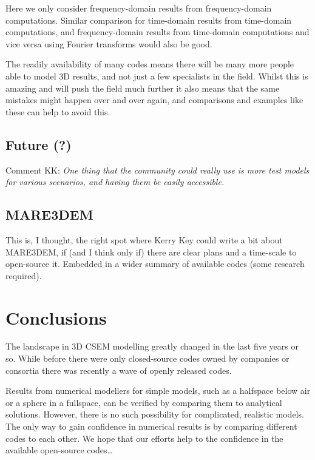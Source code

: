 \documentclass[
    paper,
  ]{geophysics}
\begin{document}
Here we only consider frequency-domain results from frequency-domain
computations. Similar comparison for time-domain results from time-domain
computations, and frequency-domain results from time-domain computations and
vice versa using Fourier transforms would also be good.

The readily availability of many codes means there will be many more people
able to model 3D results, and not just a few specialists in the field. Whilst
this is amazing and will push the field much further it also means that the
same mistakes might happen over and over again, and comparisons and examples
like these can help to avoid this.

\subsection{Future (?)}

Comment KK: \emph{One thing that the community could really use is more test
models for various scenarios, and having them be easily accessible.}


\subsection{MARE3DEM}

This is, I thought, the right spot where Kerry Key could write a bit about
MARE3DEM, if (and I think only if) there are clear plans and a time-scale to
open-source it. Embedded in a wider summary of available codes (some research
required).

\clearpage  %
\section{Conclusions}

The landscape in 3D CSEM modelling greatly changed in the last five years or
so. While before there were only closed-source codes owned by companies or
consortia there was recently a wave of openly released codes.

Results from numerical modellers for simple models, such as a halfspace below
air or a sphere in a fullspace, can be verified by comparing them to analytical
solutions. However, there is no such possibility for complicated, realistic
models. The only way to gain confidence in numerical results is by comparing
different codes to each other. We hope that our efforts help to the confidence
in the available open-source codes\dots
\end{document}
